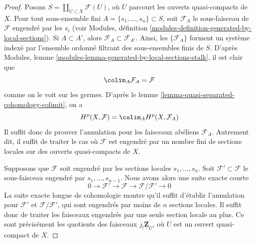 \begin{proof}

Posons $S = \coprod_{U \subset X} \mathcal{F}(U)$, où $U$ parcourt les ouverts quasi-compacts de $X$. Pour tout sous-ensemble fini $A = \{s_1, \ldots, s_n\} \subset S$, soit $\mathcal{F}_A$ le sous-faisceau de $\mathcal{F}$ engendré par les $s_i$ (voir Modules, définition \ref{modules-definition-generated-by-local-sections}). Si $A \subset A'$, alors $\mathcal{F}_A \subset \mathcal{F}_{A'}$. Ainsi, les $\{\mathcal{F}_A\}$ forment un système indexé par l'ensemble ordonné filtrant des sous-ensembles finis de $S$. D'après Modules, lemme \ref{modules-lemma-generated-by-local-sections-stalk},
il est clair que
$$
\colim_A \mathcal{F}_A = \mathcal{F}
$$
comme on le voit sur les germes. D'après le lemme \ref{lemma-quasi-separated-cohomology-colimit}, on a
$$
H^p(X, \mathcal{F}) =
\colim_A H^p(X, \mathcal{F}_A)
$$
Il suffit donc de prouver l'annulation pour les faisceaux abéliens
$\mathcal{F}_A$. Autrement dit, il suffit de traiter le cas où $\mathcal{F}$ est engendré par un nombre fini de sections locales sur des ouverts quasi-compacts de $X$.

\medskip\noindent
Supposons que $\mathcal{F}$ soit engendré par les sections locales $s_1, \ldots, s_n$. Soit $\mathcal{F}' \subset \mathcal{F}$ le sous-faisceau engendré par $s_1, \ldots, s_{n - 1}$. Nous avons alors une suite exacte courte $$
0 \to \mathcal{F}' \to \mathcal{F} \to \mathcal{F}/\mathcal{F}' \to 0
$$ La suite exacte longue de cohomologie montre qu'il suffit d'établir l'annulation pour $\mathcal{F}'$ et $\mathcal{F}/\mathcal{F}'$, qui sont engendrés par moins de $n$ sections locales. Il suffit donc de traiter les faisceaux engendrés par une seule section locale au plus. Ce sont précisément les quotients des faisceaux $j_!\underline{\mathbf{Z}}_U$, où $U$ est un ouvert quasi-compact de $X$.

\medskip\noindent


\end{proof}
